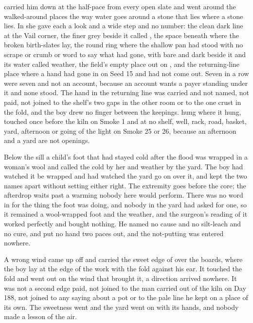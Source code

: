  carried him down at the half-pace from every open slate and went around the walked-around places the way water goes around a stone that lies where a stone lies. In  she gave each a look and a wide step and no number: the clean dark line at the Vail corner, the finer grey beside it called , the space beneath  where the broken birth-slates lay, the round ring where the shallow pan had stood with no scrape or crumb or word to say what had gone,  with  bare and dark beside it and its water called weather, the field's empty place out on , and the returning-line place where a hand had gone in on Seed 15 and had not come out. Seven in a row were seven and not an account, because an account wants a payer standing under it and none stood. The hand in the returning line was carried and not named, not paid, not joined to the shelf's two gaps in the other room or to the one crust in the fold, and the boy drew no finger between the keepings.  hung where it hung, touched once before the kiln on Smoke 1 and at no shelf, well, rack, road, basket, yard, afternoon or going of the light on Smoke 25 or 26, because an afternoon and a yard are not openings.

Below the sill a child's foot that had stayed cold after the flood was wrapped in a woman's wool and called the cold by her and weather by the yard. The boy had watched it be wrapped and had watched the yard go on over it, and kept the two names apart without setting either right. The extremity goes before the core; the afterdrop waits past a warming nobody here would perform. There was no word in  for the thing the foot was doing, and nobody in the yard had asked for one, so it remained a wool-wrapped foot and the weather, and the surgeon's reading of it worked perfectly and bought nothing. He named no cause and no silt-leach and no cure, and put no hand two paces out, and the not-putting was entered nowhere.

\scenebreak

A wrong wind came up off  and carried the sweet edge of  over the boards, where the boy lay at the edge of the work with the fold against his ear. It touched the fold and went out on the wind that brought it, a direction arrived nowhere. It was not a second edge paid, not joined to the man carried out of the kiln on Day 188, not joined to any saying about a pot or to the pale line he kept on a place of its own. The sweetness went and the yard went on with its hands, and nobody made a lesson of the air.

